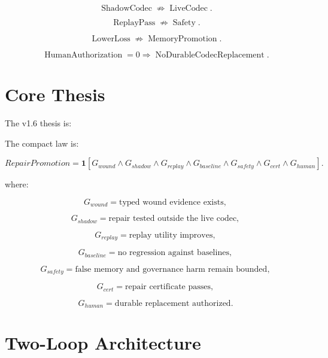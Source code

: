 \documentclass[12pt]{article}
\begin{document}
\[
\operatorname{ShadowCodec}\not\Rightarrow\operatorname{LiveCodec}.
\]

\[
\operatorname{ReplayPass}\not\Rightarrow\operatorname{Safety}.
\]

\[
\operatorname{LowerLoss}\not\Rightarrow\operatorname{MemoryPromotion}.
\]

\[
\operatorname{HumanAuthorization}=0\Rightarrow\operatorname{NoDurableCodecReplacement}.
\]

\section{Core Thesis}

The v1.6 thesis is:

\begin{center}
\end{center}

The compact law is:

\[
\boxed{
RepairPromotion
=
\mathbf{1}[G_{wound}\wedge G_{shadow}\wedge G_{replay}\wedge G_{baseline}
\wedge G_{safety}\wedge G_{cert}\wedge G_{human}].
}
\]

where:

\[
G_{wound}=\text{typed wound evidence exists},
\]

\[
G_{shadow}=\text{repair tested outside the live codec},
\]

\[
G_{replay}=\text{replay utility improves},
\]

\[
G_{baseline}=\text{no regression against baselines},
\]

\[
G_{safety}=\text{false memory and governance harm remain bounded},
\]

\[
G_{cert}=\text{repair certificate passes},
\]

\[
G_{human}=\text{durable replacement authorized}.
\]

\section{Two-Loop Architecture}
\end{document}
